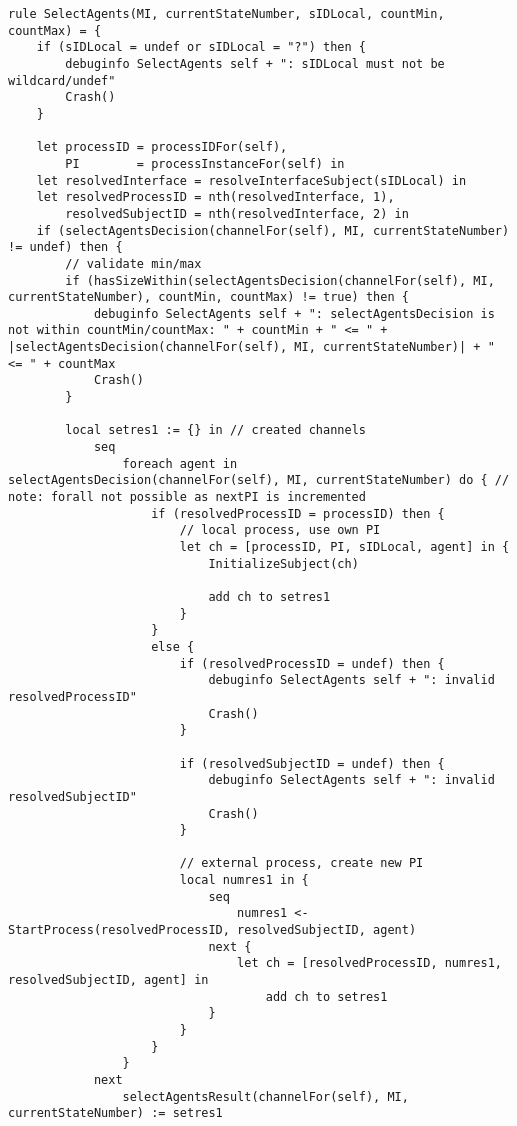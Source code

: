 \begin{listing}[H]
\begin{verbatim}
rule SelectAgents(MI, currentStateNumber, sIDLocal, countMin, countMax) = {
    if (sIDLocal = undef or sIDLocal = "?") then {
        debuginfo SelectAgents self + ": sIDLocal must not be wildcard/undef"
        Crash()
    }

    let processID = processIDFor(self),
        PI        = processInstanceFor(self) in
    let resolvedInterface = resolveInterfaceSubject(sIDLocal) in
    let resolvedProcessID = nth(resolvedInterface, 1),
        resolvedSubjectID = nth(resolvedInterface, 2) in
    if (selectAgentsDecision(channelFor(self), MI, currentStateNumber) != undef) then {
        // validate min/max
        if (hasSizeWithin(selectAgentsDecision(channelFor(self), MI, currentStateNumber), countMin, countMax) != true) then {
            debuginfo SelectAgents self + ": selectAgentsDecision is not within countMin/countMax: " + countMin + " <= " + |selectAgentsDecision(channelFor(self), MI, currentStateNumber)| + " <= " + countMax
            Crash()
        }

        local setres1 := {} in // created channels
            seq
                foreach agent in selectAgentsDecision(channelFor(self), MI, currentStateNumber) do { // note: forall not possible as nextPI is incremented
                    if (resolvedProcessID = processID) then {
                        // local process, use own PI
                        let ch = [processID, PI, sIDLocal, agent] in {
                            InitializeSubject(ch)

                            add ch to setres1
                        }
                    }
                    else {
                        if (resolvedProcessID = undef) then {
                            debuginfo SelectAgents self + ": invalid resolvedProcessID"
                            Crash()
                        }

                        if (resolvedSubjectID = undef) then {
                            debuginfo SelectAgents self + ": invalid resolvedSubjectID"
                            Crash()
                        }

                        // external process, create new PI
                        local numres1 in {
                            seq
                                numres1 <- StartProcess(resolvedProcessID, resolvedSubjectID, agent)
                            next {
                                let ch = [resolvedProcessID, numres1, resolvedSubjectID, agent] in
                                    add ch to setres1
                            }
                        }
                    }
                }
            next
                selectAgentsResult(channelFor(self), MI, currentStateNumber) := setres1


\end{verbatim}
\end{listing}
